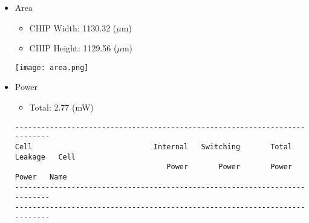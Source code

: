 \documentclass{article}
\begin{document}
            \begin{itemize}
                \item Area
                    \begin{itemize}
                        \item CHIP Width: 1130.32 ($\mu$m)
                        \item CHIP Height: 1129.56 ($\mu$m)
                    \end{itemize}
                    \texttt{[image: area.png]}
                \item Power
                \begin{itemize}
                    \item Total: 2.77 (mW)
                \end{itemize}
                \begin{lstlisting}[backgroundcolor = \color{white},basicstyle=\small\sffamily]
---------------------------------------------------------------------------
Cell                            Internal   Switching       Total     Leakage   Cell
                                   Power       Power       Power       Power   Name
---------------------------------------------------------------------------
---------------------------------------------------------------------------


\end{lstlisting}
\end{itemize}
\end{document}
